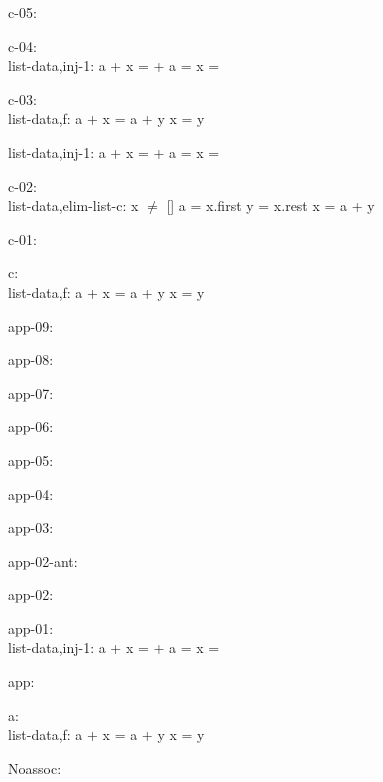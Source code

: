 \documentclass[a4paper]{article}
\begin{document}
\bigskip

c-05:\\ 

\bigskip

c-04:\\ list-data,inj-1: 
 \Fol a + x =  +  \Equiv a =  \And x = 



\bigskip

c-03:\\ list-data,f: 
 \Fol a + x = a + y \Equiv x = y



list-data,inj-1: 
 \Fol a + x =  +  \Equiv a =  \And x = 



\bigskip

c-02:\\ list-data,elim-list-c: 
x $\neq$ []
 \Fol a = x.first \And y = x.rest \Equiv x = a + y



\bigskip

c-01:\\ 

\bigskip

c:\\ list-data,f: 
 \Fol a + x = a + y \Equiv x = y



\bigskip

app-09:\\ 

\bigskip

app-08:\\ 

\bigskip

app-07:\\ 

\bigskip

app-06:\\ 

\bigskip

app-05:\\ 

\bigskip

app-04:\\ 

\bigskip

app-03:\\ 

\bigskip

app-02-ant:\\ 

\bigskip

app-02:\\ 

\bigskip

app-01:\\ list-data,inj-1: 
 \Fol a + x =  +  \Equiv a =  \And x = 



\bigskip

app:\\ 

\bigskip

a:\\ list-data,f: 
 \Fol a + x = a + y \Equiv x = y



\bigskip

Noassoc:\\ 

\bigskip
\end{document}
